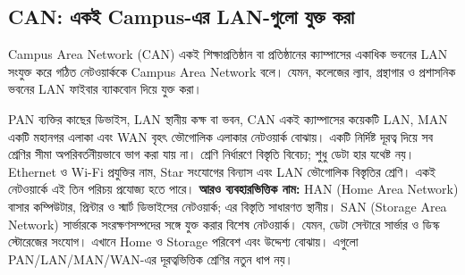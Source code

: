 \subsection{CAN: একই Campus-এর LAN-গুলো যুক্ত করা}
\begin{definitionbox}{Campus Area Network (CAN)}
একই শিক্ষাপ্রতিষ্ঠান বা প্রতিষ্ঠানের ক্যাম্পাসের একাধিক ভবনের LAN সংযুক্ত করে গঠিত নেটওয়ার্ককে Campus Area Network বলে। যেমন, কলেজের ল্যাব, গ্রন্থাগার ও প্রশাসনিক ভবনের LAN ফাইবার ব্যাকবোন দিয়ে যুক্ত করা।
\end{definitionbox}
PAN ব্যক্তির কাছের ডিভাইস, LAN স্থানীয় কক্ষ বা ভবন, CAN একই ক্যাম্পাসের কয়েকটি LAN, MAN একটি মহানগর এলাকা এবং WAN বৃহৎ ভৌগোলিক এলাকার নেটওয়ার্ক বোঝায়। একটি নির্দিষ্ট দূরত্ব দিয়ে সব শ্রেণির সীমা অপরিবর্তনীয়ভাবে ভাগ করা যায় না। শ্রেণি নির্ধারণে বিস্তৃতি বিবেচ্য; শুধু ডেটা হার যথেষ্ট নয়। Ethernet ও Wi-Fi প্রযুক্তির নাম, Star সংযোগের বিন্যাস এবং LAN ভৌগোলিক বিস্তৃতির শ্রেণি। একই নেটওয়ার্কে এই তিন পরিচয় প্রযোজ্য হতে পারে।
\textbf{আরও ব্যবহারভিত্তিক নাম:} HAN (Home Area Network) বাসার কম্পিউটার, প্রিন্টার ও স্মার্ট ডিভাইসের নেটওয়ার্ক; এর বিস্তৃতি সাধারণত স্থানীয়। SAN (Storage Area Network) সার্ভারকে সংরক্ষণসম্পদের সঙ্গে যুক্ত করার বিশেষ নেটওয়ার্ক। যেমন, ডেটা সেন্টারে সার্ভার ও ডিস্ক স্টোরেজের সংযোগ। এখানে Home ও Storage পরিবেশ এবং উদ্দেশ্য বোঝায়। এগুলো PAN/LAN/MAN/WAN-এর দূরত্বভিত্তিক শ্রেণির নতুন ধাপ নয়।

